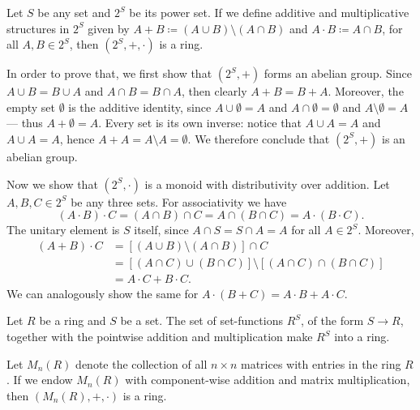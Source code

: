 %
\begin{example}
\label{exp:power-set-ring}
Let \(S\) be any set and \(2^S\) be its power set. If we define additive and
multiplicative structures in \(2^S\) given by
\(A + B \coloneq (A \cup B) \setminus (A \cap B)\) and
\(A \cdot B \coloneq A \cap B\), for all \(A, B \in 2^S\), then
\((2^S, +, \cdot)\) is a ring.

In order to prove that, we first show that \((2^S, +)\) forms an abelian
group. Since \(A \cup B = B \cup A\) and \(A \cap B = B \cap A\), then clearly
\(A + B = B + A\). Moreover, the empty set \(\emptyset\) is the additive
identity, since \(A \cup \emptyset = A\) and \(A \cap \emptyset = \emptyset\)
and \(A \setminus \emptyset = A\) --- thus \(A + \emptyset = A\). Every set is
its own inverse: notice that \(A \cup A = A\) and \(A \cup A = A\), hence
\(A + A = A \setminus A = \emptyset\). We therefore conclude that \((2^S, +)\)
is an abelian group.

Now we show that \((2^S, \cdot)\) is a monoid with distributivity over
addition. Let \(A, B, C \in 2^S\) be any three sets. For associativity we have
\[
  (A \cdot B) \cdot C
  = (A \cap B) \cap C
  = A \cap (B \cap C)
  = A \cdot (B \cdot C).
\]
The unitary element is \(S\) itself, since \(A \cap S = S \cap A = A\) for all
\(A \in 2^S\). Moreover,
\begin{align*}
  (A + B) \cdot C
  &= [(A \cup B) \setminus (A \cap B)] \cap C \\
  &= [(A \cap C) \cup (B \cap C)] \setminus [(A \cap C) \cap (B \cap C)] \\
  &= A \cdot C + B \cdot C.
\end{align*}
We can analogously show the same for
\(A \cdot (B + C) = A \cdot B + A \cdot C\).
\end{example}
%

%
\begin{example}
\label{exp:function-ring}
Let \(R\) be a ring and \(S\) be a set. The set of set-functions \(R^S\), of the
form \(S \to R\), together with the pointwise addition and multiplication make
\(R^S\) into a ring.
\end{example}
%

%
\begin{example}
\label{exp:square-matrices-ring}
Let \(M_n(R)\) denote the collection of all \(n \times n\) matrices with entries
in the ring \(R\). If we endow \(M_n(R)\) with component-wise addition and matrix
multiplication, then \((M_n(R), +, \cdot)\) is a ring.
\end{example}
%

